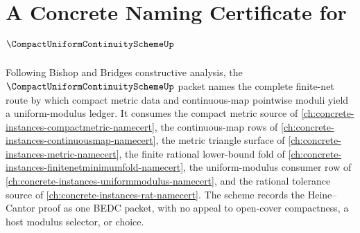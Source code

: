 \chapter{A Concrete Naming Certificate for $\CompactUniformContinuitySchemeUp$}
\label{ch:concrete-instances-compact-uniform-continuity-scheme-namecert}

Following Bishop and Bridges constructive analysis, the $\CompactUniformContinuitySchemeUp$ packet names the complete finite-net route by which compact metric data and continuous-map pointwise moduli yield a uniform-modulus ledger. It consumes the compact metric source of \autoref{ch:concrete-instances-compactmetric-namecert}, the continuous-map rows of \autoref{ch:concrete-instances-continuousmap-namecert}, the metric triangle surface of \autoref{ch:concrete-instances-metric-namecert}, the finite rational lower-bound fold of \autoref{ch:concrete-instances-finitenetminimumfold-namecert}, the uniform-modulus consumer row of \autoref{ch:concrete-instances-uniformmodulus-namecert}, and the rational tolerance source of \autoref{ch:concrete-instances-rat-namecert}. The scheme records the Heine--Cantor proof as one BEDC packet, with no appeal to open-cover compactness, a host modulus selector, or choice.

